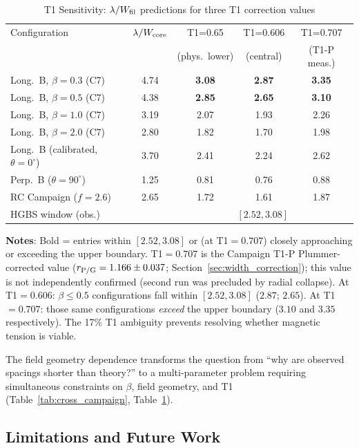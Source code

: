 \documentclass[twoside,twocolumn]{mnras}
\begin{document}
\begin{table}
\caption{T1 Sensitivity: $\lambda/W_{\rm fil}$ predictions for three T1 correction values}
\label{tab:t1_budget}
\small
\begin{tabular}{lcccc}
\toprule
Configuration & $\lambda/W_{\rm core}$ & T1=0.65 & T1=0.606 & T1=0.707 \\
              &                       & (phys.\ lower) & (central) & (T1-P meas.) \\
\midrule
Long.\ B, $\beta=0.3$ (C7) & 4.74 & \textbf{3.08} & \textbf{2.87} & \textbf{3.35} \\
Long.\ B, $\beta=0.5$ (C7) & 4.38 & \textbf{2.85} & \textbf{2.65} & \textbf{3.10} \\
Long.\ B, $\beta=1.0$ (C7) & 3.19 & 2.07 & 1.93 & 2.26 \\
Long.\ B, $\beta=2.0$ (C7) & 2.80 & 1.82 & 1.70 & 1.98 \\
Long.\ B (calibrated, $\theta=0^\circ$) & 3.70 & 2.41 & 2.24 & 2.62 \\
Perp.\ B ($\theta=90^\circ$) & 1.25 & 0.81 & 0.76 & 0.88 \\
RC Campaign ($f=2.6$) & 2.65 & 1.72 & 1.61 & 1.87 \\
\midrule
\multicolumn{2}{l}{HGBS window (obs.)} & \multicolumn{3}{c}{$[2.52, 3.08]$} \\
\bottomrule
\end{tabular}
\vspace{2pt}
\footnotesize
\textbf{Notes}: Bold = entries within $[2.52, 3.08]$ or (at T1$=0.707$) closely approaching or exceeding the upper boundary. T1$=0.707$ is the Campaign T1-P Plummer-corrected value ($r_{\rm P/G} = 1.166 \pm 0.037$; Section~\ref{sec:width_correction}); this value is not independently confirmed (second run was precluded by radial collapse). At T1$=0.606$: $\beta \leq 0.5$ configurations fall within $[2.52, 3.08]$ ($2.87$; $2.65$). At T1$=0.707$: those same configurations \textit{exceed} the upper boundary ($3.10$ and $3.35$ respectively). The 17\% T1 ambiguity prevents resolving whether magnetic tension is viable.
\end{table}

The field geometry dependence transforms the question from ``why are observed spacings
shorter than theory?'' to a multi-parameter problem requiring simultaneous constraints
on $\beta$, field geometry, and T1 (Table~\ref{tab:cross_campaign}, Table~\ref{tab:t1_budget}).

\subsection{Limitations and Future Work}
\end{document}
